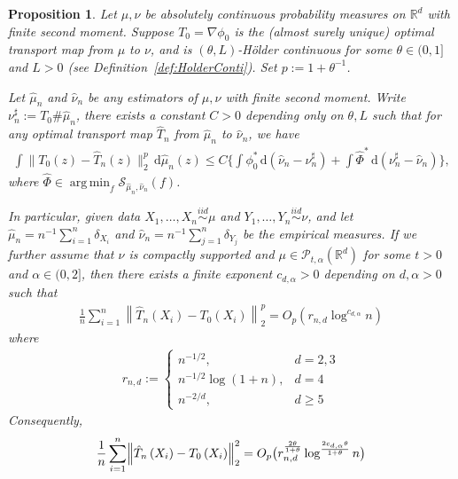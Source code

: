 \documentclass[11pt]{article}
\newtheorem{prop}[thm]{Proposition}
\DeclareMathOperator*{\argmin}{arg\,min}
\begin{document}
\begin{prop}\label{prop:HolderOTConvergence}
Let $\mu, \nu$ be absolutely continuous probability measures on $\mathbb{R}^d$ with finite second moment. Suppose $T_0=\nabla \phi_0$ is the (almost surely unique) optimal transport map from $\mu$ to $\nu$, and is $(\theta, L)$-Hölder continuous for some $\theta \in (0, 1]$ and $L>0$ (see Definition~\ref{def:HolderConti}). Set $p:=1+\theta^{-1}$.

Let $\hat\mu_n$ and $\hat\nu_n$ be any estimators of $\mu, \nu$ with finite second moment. Write $\nu_n^\sharp := T_0\# \hat\mu_n$, there exists a constant $C>0$ depending only on $\theta, L$ such that for any optimal transport map $\hat T_n$ from $\hat{\mu}_n$ to $\hat{\nu}_n$, we have
\begin{align}
\int \|T_0(z) -  \hat{T}_n(z)\|_2^{p}  \, \mathrm{d}\hat{\mu}_n(z) \leq C \biggl\{\int \phi_0^*\, \mathrm{d}(\hat \nu_n - \nu_n^\sharp) + \int \hat{\Phi}^* \, \mathrm{d}(\nu_n^\sharp -  \hat\nu_n)\biggr\}, \label{eq:OTEstimationErrors}
\end{align}
where $\hat{\Phi} \in \argmin_{f} \mathcal{S}_{\hat\mu_n, \hat\nu_n}(f)$. 

In particular, given data $X_1, \ldots, X_n \stackrel{i i d}{\sim} \mu$ and $Y_1, \ldots, Y_n \stackrel{i i d}{\sim} \nu$, and let $\hat{\mu}_n= n^{-1} \sum_{i=1}^n \delta_{X_i}$ and $\hat{\nu}_n=n^{-1} \sum_{j=1}^n \delta_{Y_j}$ be the empirical measures. If we further assume that $\nu$ is compactly supported and $\mu \in \mathcal{P}_{t, \alpha}(\mathbb{R}^d)$ for some $t>0$ and $\alpha\in (0, 2]$, then there exists a finite exponent $c_{d, \alpha}>0$ depending on $d, \alpha > 0$ such that 
\begin{align*}
\frac{1}{n} \sum_{i=1}^n\left\|\hat{T}_n\left(X_i\right)-T_0\left(X_i\right)\right\|_2^p=O_p\left(r_{n, d} \log ^{c_{d, \alpha}} n\right)
\end{align*}
where
\begin{align*}
    r_{n, d}:= \begin{cases}
    n^{-1 / 2}, & d = 2, 3 \\ n^{-1 / 2} \log (1+n), & d=4 \\ n^{-2 / d}, & d \geq 5\end{cases}
\end{align*}
Consequently,
\begin{align*}
\frac{1}{n} \sum_{i=1}^n\Bigl\|\hat{T}_n\left(X_i\right)-T_0\left(X_i\right)\Bigr\|_2^2=O_p\bigl(r_{n, d}^{\frac{2 \theta}{1+\theta}} \log ^{\frac{2 c_{d, \alpha}\theta}{1+\theta}} n\bigr)
\end{align*}
\end{prop}
\end{document}
